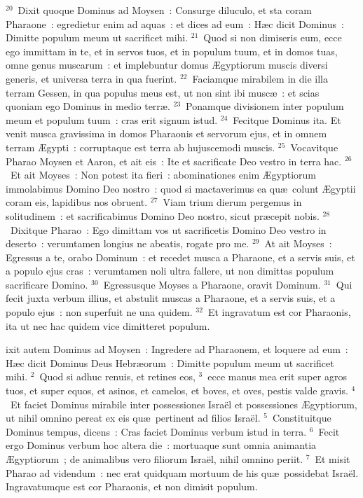 ${}^{20}$~Dixit quoque Dominus ad Moysen~: Consurge diluculo, et sta coram Pharaone~: egredietur enim ad aquas~: et dices ad eum~: H\ae c dicit Dominus~: Dimitte populum meum ut sacrificet mihi.
${}^{21}$~Quod si non dimiseris eum, ecce ego immittam in te, et in servos tuos, et in populum tuum, et in domos tuas, omne genus muscarum~: et implebuntur domus \AE gyptiorum muscis diversi generis, et universa terra in qua fuerint.
${}^{22}$~Faciamque mirabilem in die illa terram Gessen, in qua populus meus est, ut non sint ibi musc\ae~: et scias quoniam ego Dominus in medio terr\ae .
${}^{23}$~Ponamque divisionem inter populum meum et populum tuum~: cras erit signum istud.
${}^{24}$~Fecitque Dominus ita. Et venit musca gravissima in domos Pharaonis et servorum ejus, et in omnem terram \AE gypti~: corruptaque est terra ab hujuscemodi muscis.
${}^{25}$~Vocavitque Pharao Moysen et Aaron, et ait eis~: Ite et sacrificate Deo vestro in terra hac.
${}^{26}$~Et ait Moyses~: Non potest ita fieri~: abominationes enim \AE gyptiorum immolabimus Domino Deo nostro~: quod si mactaverimus ea qu\ae\ colunt \AE gyptii coram eis, lapidibus nos obruent.
${}^{27}$~Viam trium dierum pergemus in solitudinem~: et sacrificabimus Domino Deo nostro, sicut pr\ae cepit nobis.
${}^{28}$~Dixitque Pharao~: Ego dimittam vos ut sacrificetis Domino Deo vestro in deserto~: verumtamen longius ne abeatis, rogate pro me.
${}^{29}$~At ait Moyses~: Egressus a te, orabo Dominum~: et recedet musca a Pharaone, et a servis suis, et a populo ejus cras~: verumtamen noli ultra fallere, ut non dimittas populum sacrificare Domino.
${}^{30}$~Egressusque Moyses a Pharaone, oravit Dominum.
${}^{31}$~Qui fecit juxta verbum illius, et abstulit muscas a Pharaone, et a servis suis, et a populo ejus~: non superfuit ne una quidem.
${}^{32}$~Et ingravatum est cor Pharaonis, ita ut nec hac quidem vice dimitteret populum.

\bchapter
{}ixit autem Dominus ad Moysen~: Ingredere ad Pharaonem, et loquere ad eum~: H\ae c dicit Dominus Deus Hebr\ae orum~: Dimitte populum meum ut sacrificet mihi.
${}^{2}$~Quod si adhuc renuis, et retines eos,
${}^{3}$~ecce manus mea erit super agros tuos, et super equos, et asinos, et camelos, et boves, et oves, pestis valde gravis.
${}^{4}$~Et faciet Dominus mirabile inter possessiones Isra\"el et possessiones \AE gyptiorum, ut nihil omnino pereat ex eis qu\ae\ pertinent ad filios Isra\"el.
${}^{5}$~Constituitque Dominus tempus, dicens~: Cras faciet Dominus verbum istud in terra.
${}^{6}$~Fecit ergo Dominus verbum hoc altera die~: mortuaque sunt omnia animantia \AE gyptiorum~; de animalibus vero filiorum Isra\"el, nihil omnino periit.
${}^{7}$~Et misit Pharao ad videndum~: nec erat quidquam mortuum de his qu\ae\ possidebat Isra\"el. Ingravatumque est cor Pharaonis, et non dimisit populum.


